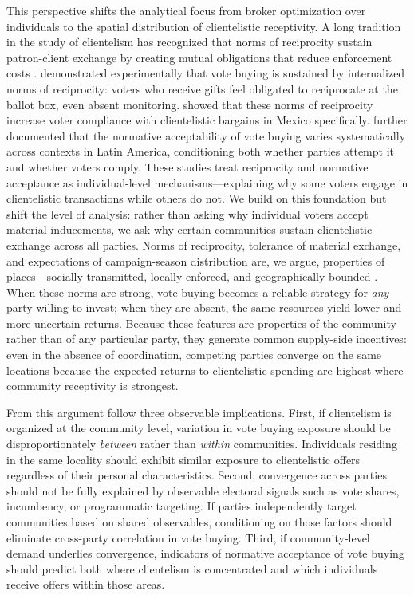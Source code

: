 \documentclass[12pt,letterpaper]{article}
\begin{document}
This perspective shifts the analytical focus from broker optimization over individuals to the spatial distribution of clientelistic receptivity. A long tradition in the study of clientelism has recognized that norms of reciprocity sustain patron-client exchange by creating mutual obligations that reduce enforcement costs \citep{scott1972patron, lemarchand1972political}. \citet{finan2012information} demonstrated experimentally that vote buying is sustained by internalized norms of reciprocity: voters who receive gifts feel obligated to reciprocate at the ballot box, even absent monitoring. \citet{lawson2014making} showed that these norms of reciprocity increase voter compliance with clientelistic bargains in Mexico specifically. \citet{gonzalezocantos2014conditionality} further documented that the normative acceptability of vote buying varies systematically across contexts in Latin America, conditioning both whether parties attempt it and whether voters comply. These studies treat reciprocity and normative acceptance as individual-level mechanisms---explaining why some voters engage in clientelistic transactions while others do not. We build on this foundation but shift the level of analysis: rather than asking why individual voters accept material inducements, we ask why certain communities sustain clientelistic exchange across all parties. Norms of reciprocity, tolerance of material exchange, and expectations of campaign-season distribution are, we argue, properties of places---socially transmitted, locally enforced, and geographically bounded \citep[see also][]{aspinall2019democracy, cohen2025vote}. When these norms are strong, vote buying becomes a reliable strategy for \textit{any} party willing to invest; when they are absent, the same resources yield lower and more uncertain returns. Because these features are properties of the community rather than of any particular party, they generate common supply-side incentives: even in the absence of coordination, competing parties converge on the same locations because the expected returns to clientelistic spending are highest where community receptivity is strongest.

From this argument follow three observable implications. First, if clientelism is organized at the community level, variation in vote buying exposure should be disproportionately \textit{between} rather than \textit{within} communities. Individuals residing in the same locality should exhibit similar exposure to clientelistic offers regardless of their personal characteristics. Second, convergence across parties should not be fully explained by observable electoral signals such as vote shares, incumbency, or programmatic targeting. If parties independently target communities based on shared observables, conditioning on those factors should eliminate cross-party correlation in vote buying. Third, if community-level demand underlies convergence, indicators of normative acceptance of vote buying should predict both where clientelism is concentrated and which individuals receive offers within those areas.
\end{document}
